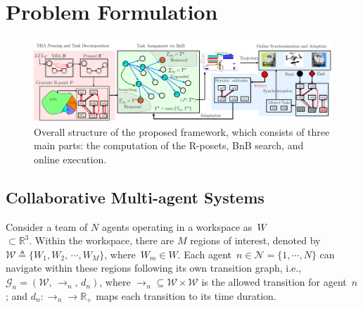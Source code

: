\section{Problem Formulation}\label{sec:problem}

\begin{figure}[t!]
	\centering
	\includegraphics[width=0.9\linewidth]{figures/logic_fig1.pdf}
	\caption{Overall structure of the proposed framework,
          which consists of three main parts:
        the computation of the R-posets, BnB search, and online execution.}
	\label{fig:logic_graph}
\end{figure}

\subsection{Collaborative Multi-agent Systems}\label{subsec:multi-agent}

Consider a team of $N$ agents operating in a workspace as~${W}$\\$\subset \mathbb{R}^3$.
Within the workspace, there are $M$ regions of interest,
denoted by ${\mathcal{W}}\triangleq \{{W}_1,{W}_2,\,\cdots,{W}_M\}$,
where~${W}_m\in {W}$.
Each agent~$n\in\mathcal{N}=\{1,\cdots,N\}$ can navigate within these regions
following its own transition graph, i.e., $\mathcal{G}_n=({\mathcal{W}},\,\rightarrow_n,\,d_n)$,
where $\rightarrow_n\subseteq {\mathcal{W}}\times {\mathcal{W}}$
is the allowed transition for agent~$n$;
and $d_n:\rightarrow_n \rightarrow \mathbb{R}_{+}$ maps each transition to its time duration.

